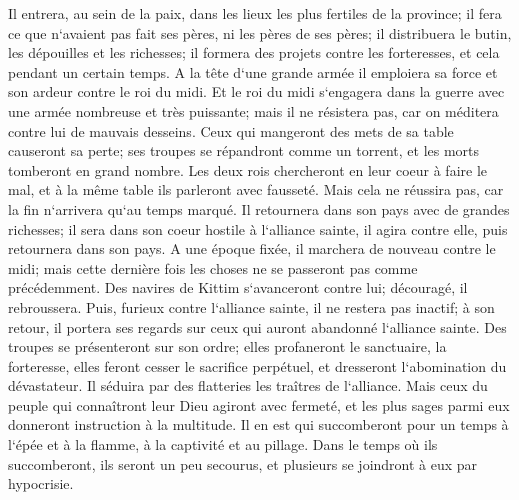 \verse Il entrera, au sein de la paix, dans les lieux les plus fertiles de la province; il fera ce que n`avaient pas fait ses pères, ni les pères de ses pères; il distribuera le butin, les dépouilles et les richesses; il formera des projets contre les forteresses, et cela pendant un certain temps. 
\verse A la tête d`une grande armée il emploiera sa force et son ardeur contre le roi du midi. Et le roi du midi s`engagera dans la guerre avec une armée nombreuse et très puissante; mais il ne résistera pas, car on méditera contre lui de mauvais desseins. 
\verse Ceux qui mangeront des mets de sa table causeront sa perte; ses troupes se répandront comme un torrent, et les morts tomberont en grand nombre. 
\verse Les deux rois chercheront en leur coeur à faire le mal, et à la même table ils parleront avec fausseté. Mais cela ne réussira pas, car la fin n`arrivera qu`au temps marqué. 
\verse Il retournera dans son pays avec de grandes richesses; il sera dans son coeur hostile à l`alliance sainte, il agira contre elle, puis retournera dans son pays. 
\verse A une époque fixée, il marchera de nouveau contre le midi; mais cette dernière fois les choses ne se passeront pas comme précédemment. 
\verse Des navires de Kittim s`avanceront contre lui; découragé, il rebroussera. Puis, furieux contre l`alliance sainte, il ne restera pas inactif; à son retour, il portera ses regards sur ceux qui auront abandonné l`alliance sainte. 
\verse Des troupes se présenteront sur son ordre; elles profaneront le sanctuaire, la forteresse, elles feront cesser le sacrifice perpétuel, et dresseront l`abomination du dévastateur. 
\verse Il séduira par des flatteries les traîtres de l`alliance. Mais ceux du peuple qui connaîtront leur Dieu agiront avec fermeté, 
\verse et les plus sages parmi eux donneront instruction à la multitude. Il en est qui succomberont pour un temps à l`épée et à la flamme, à la captivité et au pillage. 
\verse Dans le temps où ils succomberont, ils seront un peu secourus, et plusieurs se joindront à eux par hypocrisie. 
